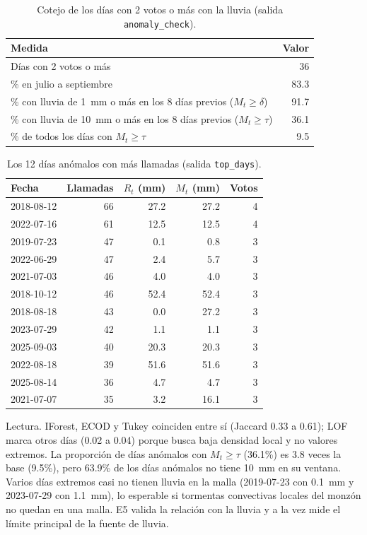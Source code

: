 \documentclass[11pt]{article}
\newcommand{\cod}[1]{\nolinkurl{#1}}
\begin{document}
\begin{table}[!htbp]
  \centering
  \small
  \caption{Cotejo de los días con 2 votos o más con la lluvia (salida \cod{anomaly_check}).}
  \label{tab:e5-cotejo}
  \begin{tabular}{lr}
    \toprule
    Medida & Valor \\
    \midrule
    Días con 2 votos o más & 36 \\
    \% en julio a septiembre & 83.3 \\
    \% con lluvia de 1~mm o más en los 8 días previos ($M_t\ge\delta$) & 91.7 \\
    \% con lluvia de 10~mm o más en los 8 días previos ($M_t\ge\tau$) & 36.1 \\
    \% de todos los días con $M_t\ge\tau$ & 9.5 \\
    \bottomrule
  \end{tabular}
\end{table}

\begin{table}[!htbp]
  \centering
  \small
  \caption{Los 12 días anómalos con más llamadas (salida \cod{top_days}).}
  \label{tab:e5-top}
  \begin{tabular}{lrrrr}
    \toprule
    Fecha & Llamadas & $R_t$ (mm) & $M_t$ (mm) & Votos \\
    \midrule
    2018-08-12 & 66 & 27.2 & 27.2 & 4 \\
    2022-07-16 & 61 & 12.5 & 12.5 & 4 \\
    2019-07-23 & 47 & 0.1 & 0.8 & 3 \\
    2022-06-29 & 47 & 2.4 & 5.7 & 3 \\
    2021-07-03 & 46 & 4.0 & 4.0 & 3 \\
    2018-10-12 & 46 & 52.4 & 52.4 & 3 \\
    2018-08-18 & 43 & 0.0 & 27.2 & 3 \\
    2023-07-29 & 42 & 1.1 & 1.1 & 3 \\
    2025-09-03 & 40 & 20.3 & 20.3 & 3 \\
    2022-08-18 & 39 & 51.6 & 51.6 & 3 \\
    2025-08-14 & 36 & 4.7 & 4.7 & 3 \\
    2021-07-07 & 35 & 3.2 & 16.1 & 3 \\
    \bottomrule
  \end{tabular}
\end{table}

Lectura. IForest, ECOD y Tukey coinciden entre sí (Jaccard 0.33 a 0.61); LOF marca otros días (0.02 a 0.04) porque busca baja densidad local y no valores extremos. La proporción de días anómalos con $M_t\ge\tau$ (36.1\%) es 3.8 veces la base (9.5\%), pero 63.9\% de los días anómalos no tiene 10~mm en su ventana. Varios días extremos casi no tienen lluvia en la malla (2019-07-23 con 0.1~mm y 2023-07-29 con 1.1~mm), lo esperable si tormentas convectivas locales del monzón \cite{adams1997} no quedan en una malla. E5 valida la relación con la lluvia y a la vez mide el límite principal de la fuente de lluvia.
\end{document}
